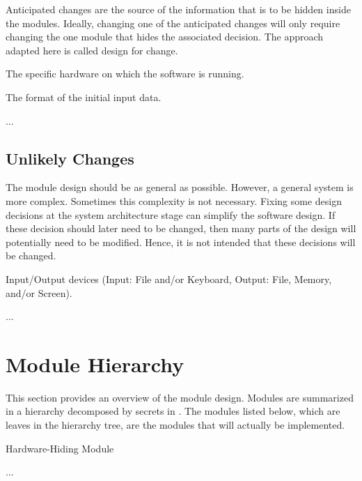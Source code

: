 \documentclass[12pt, titlepage]{article}
\newcounter{acnum}
\newcommand{\actheacnum}{AC\theacnum}
\newcounter{ucnum}
\newcommand{\uctheucnum}{UC\theucnum}
\newcounter{mnum}
\newcommand{\mthemnum}{M\themnum}
\begin{document}
Anticipated changes are the source of the information that is to be hidden
inside the modules. Ideally, changing one of the anticipated changes will only
require changing the one module that hides the associated decision. The approach
adapted here is called design for
change.

  \begin{description}
  \item[ \actheacnum \label{acHardware}:] The specific
  hardware on which the software is running.
\item[ \actheacnum \label{acInput}:] The format of the
  initial input data.
\item ...
\end{description}

\subsection{Unlikely Changes} \label{SecUchange}

The module design should be as general as possible. However, a general system is
more complex. Sometimes this complexity is not necessary. Fixing some design
decisions at the system architecture stage can simplify the software design. If
these decision should later need to be changed, then many parts of the design
will potentially need to be modified. Hence, it is not intended that these
decisions will be changed.

\begin{description}
\item[ \uctheucnum \label{ucIO}:] Input/Output devices
  (Input: File and/or Keyboard, Output: File, Memory, and/or Screen).
\item ...
\end{description}

\section{Module Hierarchy} \label{SecMH}

This section provides an overview of the module design. Modules are summarized
in a hierarchy decomposed by secrets in 
. The modules listed
below, which are leaves in the hierarchy tree, are the modules that will
actually be implemented.

\begin{description}
\item [ \mthemnum \label{mHH}:] Hardware-Hiding Module
\item ...
\end{description}
\end{document}
